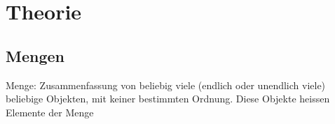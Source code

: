 \documentclass[11pt]{article} %
\begin{document}
%
%
%
%
%
%
%
%
%
%
%
%
%
%
%
%
%

\section{Theorie}
\subsection{Mengen}
Menge: Zusammenfassung von beliebig viele (endlich oder unendlich viele) beliebige Objekten, mit keiner bestimmten Ordnung. Diese Objekte heissen Elemente der Menge\\\\
\end{document}
